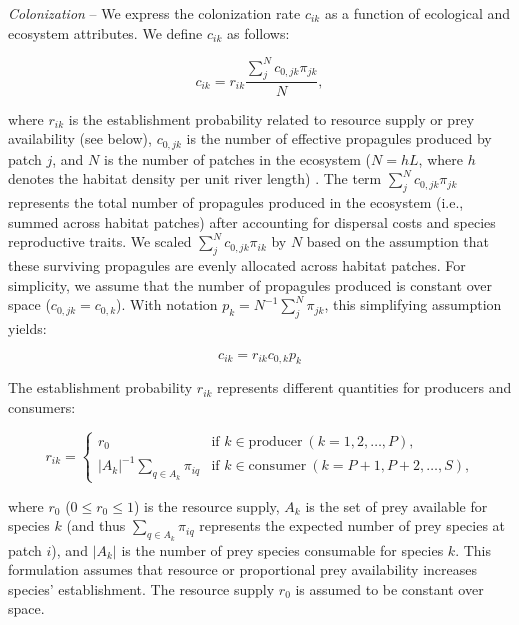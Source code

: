\documentclass[11pt, class=article, crop=false]{standalone}
\theoremstyle{definition}
\begin{document}
\textit{Colonization} --
We express the colonization rate $c_{ik}$ as a function of ecological and ecosystem attributes.
We define $c_{ik}$ as follows:

\begin{equation}
    c_{ik} = r_{ik} \frac{\sum_{j}^N c_{0, jk} \pi_{jk}}{N},
    \label{eq:clnz}
\end{equation}

where $r_{ik}$ is the establishment probability related to resource supply or prey availability (see below), $c_{0, jk}$ is the number of effective propagules produced by patch $j$, and $N$ is the number of patches in the ecosystem ($N = hL$, where $h$ denotes the habitat density per unit river length) .
The term $\sum_{j}^N c_{0, jk} \pi_{jk}$ represents the total number of propagules produced in the ecosystem (i.e., summed across habitat patches) after accounting for dispersal costs and species reproductive traits.
We scaled $\sum_{j}^N c_{0, jk} \pi_{ik}$ by $N$ based on the assumption that these surviving propagules are evenly allocated across habitat patches.
For simplicity, we assume that the number of propagules produced is constant over space ($c_{0, jk} = c_{0, k}$).
With notation $p_k = N^{-1}\sum_{j}^N \pi_{jk}$, this simplifying assumption yields:

\begin{equation}
     c_{ik} = r_{ik} c_{0, k} p_k
\end{equation}

The establishment probability $r_{ik}$ represents different quantities for producers and consumers:

\begin{equation}
    r_{ik} =
    \begin{cases}
    r_{0} & \text{if $k \in \text{producer}~(k = 1, 2, \ldots, P)$,}\\
    |A_k|^{-1} \sum_{q \in A_k} \pi_{iq} & \text{if $k \in \text{consumer}~(k = P + 1, P + 2, \ldots, S)$,}
    \end{cases}
    \label{eq:r-eq}
\end{equation}

where $r_0$ ($0 \le r_0 \le 1$) is the resource supply, $A_k$ is the set of prey available for species $k$ (and thus $\sum_{q  \in A_k} \pi_{iq}$ represents the expected number of prey species at patch $i$), and $|A_k|$ is the number of prey species consumable for species $k$.
This formulation assumes that resource or proportional prey availability increases species' establishment.
The resource supply $r_0$ is assumed to be constant over space.
\end{document}
